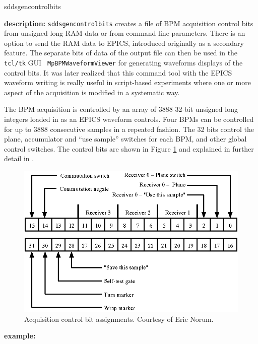 %
%
\begin{sddsprog}{sddsgencontrolbits}
\item {\bf description:}
%
%
\verb+sddsgencontrolbits+ creates a file of BPM acquisition control
bits from unsigned-long RAM data or from command line
parameters. There is an option to send the RAM data to EPICS,
introduced originally as a secondary feature. The separate bits of
data of the output file can then be used in the {\tt tcl/tk} GUI {\tt
MpBPMWaveformViewer} for generating waveforms displays of the control
bits. It was later realized that this command tool with the EPICS
waveform writing is really useful in script-based experiments where one
or more aspect of the acquisition is modified in a systematic way.

The BPM acquisition is controlled by an array of 3888 32-bit unsigned
long integers loaded in as an EPICS waveform controls. Four BPMs can
be controlled for up to 3888 consecutive samples in a repeated
fashion.  The 32 bits control the plane, accumulator and ``use
sample'' switches for each BPM, and other global control switches. The
control bits are shown in Figure \ref{fig:acquisitionControlRam} and
explained in further detail in \cite{Norum2007}.

\begin{figure}[htb]
\centering
\includegraphics[width=\textwidth]{acquisitionControlRam.eps}
\caption{Acquisition control bit assignments. Courtesy of Eric Norum.}
\label{fig:acquisitionControlRam}
\end{figure}

\item {\bf example:} 
%
% 
%


\end{sddsprog}
